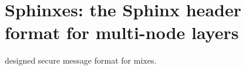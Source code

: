 \section{Sphinxes: the Sphinx header format for multi-node layers}%
\label{Sphinxes}

\Textcite{Sphinx} designed  secure message format for mixes.
